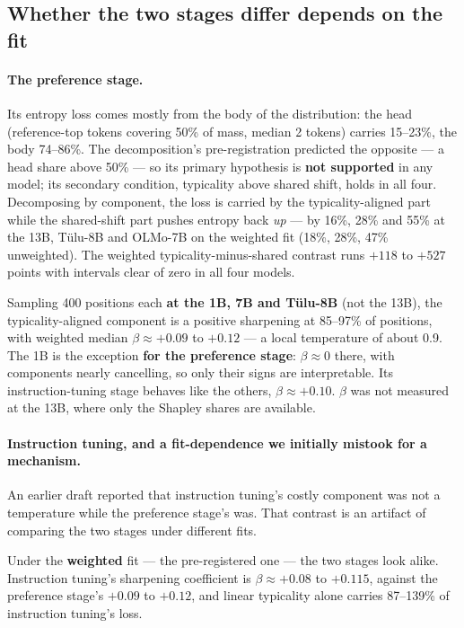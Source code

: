 \documentclass[11pt]{article}
\begin{document}
\subsection{Whether the two stages differ depends on the fit}
\label{sec:fitdep}

\paragraph{The preference stage.} Its entropy loss comes mostly from the body of the
distribution: the head (reference-top tokens covering 50\% of mass, median 2
tokens) carries 15--23\%, the body 74--86\%. The decomposition's pre-registration
predicted the opposite --- a head share above 50\% --- so its primary hypothesis is
\textbf{not supported} in any model; its secondary condition, typicality above
shared shift, holds in all four. Decomposing by component, the loss is
carried by the typicality-aligned part while the shared-shift part pushes entropy
back \emph{up} --- by 16\%, 28\% and 55\% at the 13B, T\"ulu-8B and OLMo-7B on the
weighted fit (18\%, 28\%, 47\% unweighted). The weighted typicality-minus-shared
contrast runs $+118$ to $+527$ points with intervals clear of zero in all four
models.

Sampling 400 positions each \textbf{at the 1B, 7B and T\"ulu-8B} (not the 13B), the
typicality-aligned component is a positive sharpening at 85--97\% of positions,
with weighted median $\beta \approx +0.09$ to $+0.12$ --- a local temperature of
about 0.9. The 1B is the exception \textbf{for the preference stage}:
$\beta \approx 0$ there, with components nearly cancelling, so only their signs are
interpretable. Its instruction-tuning stage behaves like the others,
$\beta \approx +0.10$. $\beta$ was not measured at the 13B, where only the Shapley
shares are available.

\paragraph{Instruction tuning, and a fit-dependence we initially mistook for a
mechanism.} An earlier draft reported that instruction tuning's costly component was
not a temperature while the preference stage's was. That contrast is an artifact of
comparing the two stages under different fits.

Under the \textbf{weighted} fit --- the pre-registered one --- the two stages look
alike. Instruction tuning's sharpening coefficient is $\beta \approx +0.08$ to
$+0.115$, against the preference stage's $+0.09$ to $+0.12$, and linear typicality
alone carries 87--139\% of instruction tuning's loss.
\end{document}
